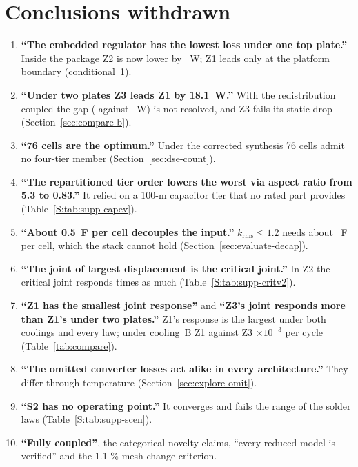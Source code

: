 \documentclass[10pt]{article}
\newcommand{\cl}[1]{\textbf{#1}\enspace}
\begin{document}
\section*{Conclusions withdrawn}
\begin{enumerate}
\item \cl{``The embedded regulator has the lowest loss under one top plate.''} Inside the package Z2
is now lower by \GapAZtwo~W; Z1 leads only at the platform boundary (conditional~1).
\item \cl{``Under two plates Z3 leads Z1 by 18.1~W.''} With the redistribution coupled the gap
(\PlossBZthree{} against \PlossBZone~W) is not resolved, and Z3 fails its static drop
(Section~\ref{sec:compare-b}).
\item \cl{``76 cells are the optimum.''} Under the corrected synthesis 76 cells admit no four-tier
member (Section~\ref{sec:dse-count}).
\item \cl{``The repartitioned tier order lowers the worst via aspect ratio from 5.3 to 0.83.''} It
relied on a 100-\textmu m capacitor tier that no rated part provides (Table~\ref{S:tab:supp-capev}).
\item \cl{``About 0.5~\textmu F per cell decouples the input.''} $k_{\mathrm{rms}}\le1.2$ needs about
\WrCkTwelve~\textmu F per cell, which the stack cannot hold (Section~\ref{sec:evaluate-decap}).
\item \cl{``The joint of largest displacement is the critical joint.''} In Z2 the critical joint
responds \MvCritRatioAZtwo{} times as much (Table~\ref{S:tab:supp-critv2}).
\item \cl{``Z1 has the smallest joint response''} and \cl{``Z3's joint responds more than Z1's under
two plates.''} Z1's response is the largest under both coolings and every law; under cooling~B Z1
\MvEpsBZone{} against Z3 \MvEpsBZthree$\times10^{-3}$ per cycle (Table~\ref{tab:compare}).
\item \cl{``The omitted converter losses act alike in every architecture.''} They differ through
temperature (Section~\ref{sec:explore-omit}).
\item \cl{``S2 has no operating point.''} It converges and fails the range of the solder laws
(Table~\ref{S:tab:supp-scen}).
\item \textbf{``Fully coupled''}, the categorical novelty claims, ``every reduced model is verified'' and
the 1.1-\% mesh-change criterion.
\end{enumerate}
\end{document}
